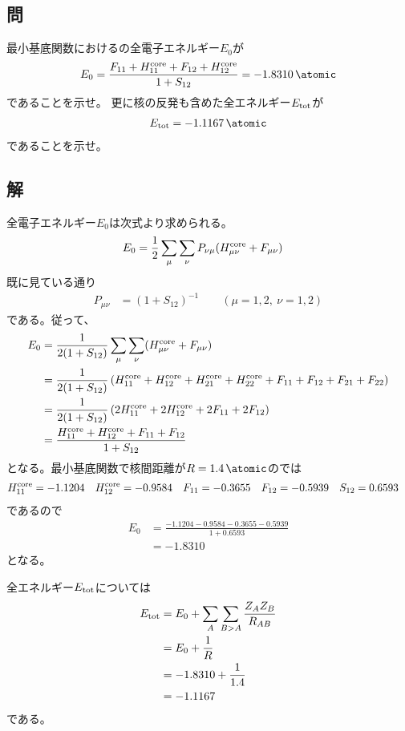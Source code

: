 \subsection{問}
最小基底関数におけるの全電子エネルギー$E_0$が
\begin{align}
	E_0
=
	\frac{
		F_{11}
		+
		H^{\rm core}_{11}
		+
		F_{12}
		+
		H^{\rm core}_{12}
	}{
		1
		+
		S_{12}
	}
=
	\SI{-1.8310}{\atomic}
\end{align}
であることを示せ。
更に核の反発も含めた全エネルギー$E_{\rm tot}$が
\begin{align}
	E_{\rm tot}
=
	\SI{-1.1167}{\atomic}
\end{align}
であることを示せ。


\subsection{解}
全電子エネルギー$E_0$は次式より求められる。
\begin{align}
	E_0
&=
	\frac{1}{2}
	\sum_\mu
	\sum_\nu
		P_{\nu\mu}
		(H^{\rm core}_{\mu\nu} +F_{\mu\nu})
\end{align}
既に見ている通り
\begin{align}
	P_{\mu\nu}
&=
	(1+S_{12})^{-1}
	\qquad
	(\mu=1,2,\ \nu=1,2)
\end{align}
である。従って、
\begin{align}
	E_0
&=
	\frac{1}{2(1+S_{12})}
	\sum_\mu
	\sum_\nu
		(H^{\rm core}_{\mu\nu} +F_{\mu\nu}) \\
%
%
&=
	\frac{1}{2(1+S_{12})}
	\left(
		H^{\rm core}_{11}
		+
		H^{\rm core}_{12}
		+
		H^{\rm core}_{21}
		+
		H^{\rm core}_{22}
		+
		F_{11}
		+
		F_{12}
		+
		F_{21}
		+
		F_{22}
	\right) \\
%
%
&=
	\frac{1}{2(1+S_{12})}
	\left(
		2H^{\rm core}_{11}
		+
		2H^{\rm core}_{12}
		+
		2F_{11}
		+
		2F_{12}
	\right) \\
%
%
&=
	\frac{
		H^{\rm core}_{11}
		+
		H^{\rm core}_{12}
		+
		F_{11}
		+
		F_{12}
	}{
		1
		+
		S_{12}
	}
\end{align}
となる。最小基底関数で核間距離が$R=\SI{1.4}{\atomic}$のでは
\begin{align}
	H^{\rm core}_{11}
&=
	-1.1204 &
%
	H^{\rm core}_{12}
&=
	-0.9584 &
%
	F_{11}
&=
	-0.3655 &
%
	F_{12}
&=
	-0.5939 &
%
	S_{12}
&=
	0.6593
\end{align}
であるので
\begin{align}
	E_0
&=
	\frac{
		-1.1204
		-0.9584
		-0.3655
		-0.5939
	}{
		1+0.6593
	} \\
%
%
&=
	-1.8310
\end{align}
となる。

全エネルギー$E_{\rm tot}$については
\begin{align}
	E_{\rm tot}
&=
	E_0
	+
	\sum_{A}
	\sum_{B>A}
		\frac{Z_A Z_B}{R_{AB}} \\
%
%
&=
	E_0
	+
	\frac{1}{R} \\
%
%
&=
	-
	1.8310
	+
	\frac{1}{1.4} \\
%
%
&=
	-1.1167
\end{align}
である。
